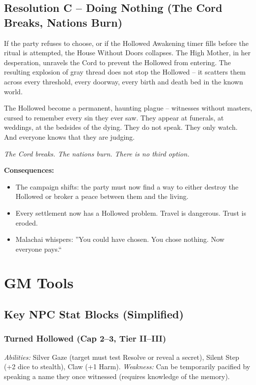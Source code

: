 \documentclass[10pt,twoside]{book}
\begin{document}
\section{Resolution C -- Doing Nothing (The Cord Breaks, Nations Burn)}
If the party refuses to choose, or if the Hollowed Awakening timer fills before the ritual is attempted, the House Without Doors collapses. The High Mother, in her desperation, unravels the Cord to prevent the Hollowed from entering. The resulting explosion of gray thread does not stop the Hollowed -- it scatters them across every threshold, every doorway, every birth and death bed in the known world.

The Hollowed become a permanent, haunting plague -- witnesses without masters, cursed to remember every sin they ever saw. They appear at funerals, at weddings, at the bedsides of the dying. They do not speak. They only watch. And everyone knows that they are judging.

\textit{The Cord breaks. The nations burn. There is no third option.}

\textbf{Consequences:}
\begin{itemize}
\item The campaign shifts: the party must now find a way to either destroy the Hollowed or broker a peace between them and the living.
\item Every settlement now has a Hollowed problem. Travel is dangerous. Trust is eroded.
\item Malachai whispers: ''You could have chosen. You chose nothing. Now everyone pays.``
\end{itemize}

\chapter{GM Tools}

\section{Key NPC Stat Blocks (Simplified)}
\subsection{Turned Hollowed (Cap 2--3, Tier II--III)}
\textit{Abilities:} Silver Gaze (target must test Resolve or reveal a secret), Silent Step (+2 dice to stealth), Claw (+1 Harm). \textit{Weakness:} Can be temporarily pacified by speaking a name they once witnessed (requires knowledge of the memory).
\end{document}
